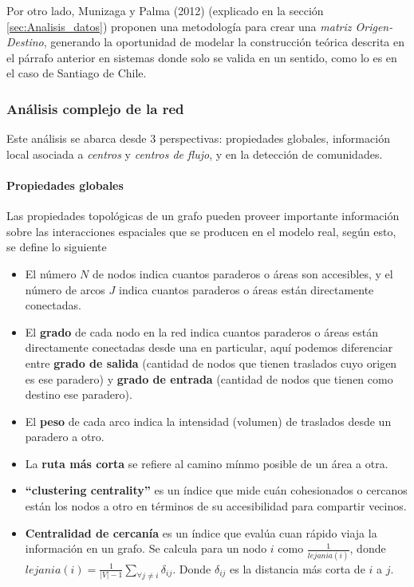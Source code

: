 \documentclass[12pt]{article}
\begin{document}
	Por otro lado, Munizaga y Palma (2012) \cite{Procesamiento_datos} (explicado en la sección \ref{sec:Analisis_datos}) proponen una metodología para crear una \textit{matriz Origen-Destino}, generando la oportunidad de modelar la construcción teórica descrita en el párrafo anterior en sistemas donde solo se valida en un sentido, como lo es en el caso de Santiago de Chile.
	
	\subsubsection{Análisis complejo de la red}    

Este análisis se abarca desde 3 perspectivas: propiedades globales, información local asociada a \textit{centros} y \textit{centros de flujo}, y en la detección de comunidades. 

	\paragraph{Propiedades globales}

Las propiedades topológicas de un grafo pueden proveer importante información sobre las interacciones espaciales que se producen en el modelo real, según esto, se define lo siguiente

	\begin{itemize}
	
		\item El número $N$ de nodos indica cuantos paraderos o áreas son accesibles, y el número de arcos $J$ indica cuantos paraderos o áreas están directamente conectadas.
		\item El \textbf{grado} de cada nodo en la red indica cuantos paraderos o áreas están directamente conectadas desde una en particular, aquí podemos diferenciar entre \textbf{grado de salida} (cantidad de nodos que tienen traslados cuyo origen es ese paradero) y \textbf{grado de entrada} (cantidad de nodos que tienen como destino ese paradero).
		
		\item El \textbf{peso} de cada arco indica la intensidad (volumen) de traslados desde un paradero a otro.
		
		\item La \textbf{ruta más corta} se refiere al camino mínmo posible de un área a otra.
		
		\item \textbf{``clustering centrality''} es un índice que mide cuán cohesionados o cercanos están los nodos a otro en términos de su accesibilidad para compartir vecinos.

		
		\item \textbf{Centralidad de cercanía} es un índice que evalúa cuan rápido viaja la información en un grafo. Se calcula para un nodo $i$ como $\frac{1}{lejania(i)}$, donde $lejania(i)=\frac{1}{|V|-1}\sum_{\forall j\not=i}\delta_{ij}$. Donde $\delta_{ij}$ es la distancia más corta de $i$ a $j$.
		
	\end{itemize}
\end{document}
